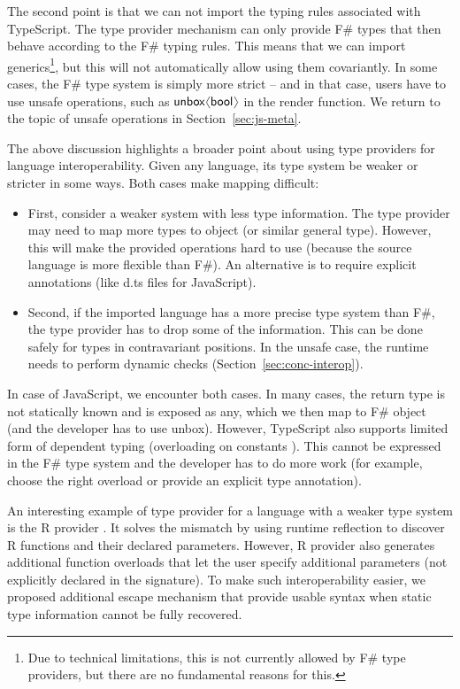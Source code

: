\documentclass[submission,copyright,creativecommons]{eptcs}
\newcommand{\langl}{\begin{picture}(4.5,7)
\put(1.1,2.5){\rotatebox{60}{\line(1,0){5.5}}}
\put(1.1,2.5){\rotatebox{300}{\line(1,0){5.5}}}
\end{picture}}
\newcommand{\rangl}{\begin{picture}(4.5,7)
\put(.9,2.5){\rotatebox{120}{\line(1,0){5.5}}}
\put(.9,2.5){\rotatebox{240}{\line(1,0){5.5}}}
\end{picture}}
\newcommand{\kvd}[1]{\textnormal{\textcolor{kvdclr}{\sffamily #1}}}
\newcommand{\ident}[1]{\textnormal{\sffamily #1}}
\begin{document}
The second point is that we can not import the typing rules associated with TypeScript.
The type provider mechanism can only provide F\# types that then behave according to the
F\# typing rules. This means that we can import generics\footnote{Due to technical
limitations, this is not currently allowed by F\# type providers, but there are no
fundamental reasons for this.}, but this will not automatically allow using them
covariantly. In some cases, the F\# type system is simply more strict -- and in that case,
users have to use unsafe operations, such as $\ident{unbox}\langl \ident{bool} \rangl$
in the \ident{render} function. We return to the topic of unsafe operations in
Section~\ref{sec:js-meta}.

The above discussion highlights a broader point about using type providers for language
interoperability. Given any language, its type system be weaker or stricter in some ways.
Both cases make mapping difficult:

\begin{itemize}
\item First, consider a weaker system with less type information. The type provider may need
  to map more types to \ident{object} (or similar general type). However, this will make
  the provided operations hard to use (because the source language is more flexible than
  F\#). An alternative is to require explicit annotations (like \textcolor{strclr}{\ttfamily d.ts}
  files for JavaScript).

\item Second, if the imported language has a more precise type system than F\#, the type
  provider has to drop some of the information. This can be done safely for types in
  contravariant positions. In the unsafe case, the runtime needs to perform dynamic checks
  (Section~\ref{sec:conc-interop}).
\end{itemize}

\noindent
In case of JavaScript, we encounter both cases. In many cases, the return type is not
statically known and is exposed as \kvd{any}, which we then map to F\# \ident{object}
(and the developer has to use \ident{unbox}). However, TypeScript also supports limited
form of dependent typing (overloading on constants \cite{ms-typescript-09}). This cannot
be expressed in the F\# type system and the developer has to do more work (for example,
choose the right overload or provide an explicit type annotation).

An interesting example of type provider for a language with a weaker type system is the
R provider \cite{fsharp-rprovider}. It solves the mismatch by using runtime reflection
to discover R functions and their declared parameters. However, R provider also generates
additional function overloads that let the user specify additional parameters (not explicitly
declared in the signature). To make such interoperability easier, we proposed additional
escape mechanism \cite{fsharp-paramsdict} that provide usable syntax when static type information
cannot be fully recovered.
\end{document}
